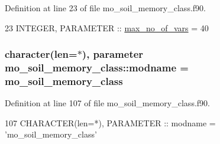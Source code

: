 Definition at line 23 of file mo\+\_\+soil\+\_\+memory\+\_\+class.\+f90.


\begin{DoxyCode}
23   \textcolor{keywordtype}{INTEGER}, \textcolor{keywordtype}{PARAMETER} :: \hyperlink{namespacemo__atmland__memory__class_afae3263e73e4c64ed0955c7ac81cd609}{max\_no\_of\_vars} = 40
\end{DoxyCode}
\hypertarget{namespacemo__soil__memory__class_a3cbf2b7edbe366c9e50eb360d3a1bcbd}{}
\subsubsection[{modname}]{\setlength{\rightskip}{0pt plus 5cm}character(len=$\ast$), parameter mo\+\_\+soil\+\_\+memory\+\_\+class\+::modname = \textquotesingle{}mo\+\_\+soil\+\_\+memory\+\_\+class\textquotesingle{}}\label{namespacemo__soil__memory__class_a3cbf2b7edbe366c9e50eb360d3a1bcbd}


Definition at line 107 of file mo\+\_\+soil\+\_\+memory\+\_\+class.\+f90.


\begin{DoxyCode}
107   \textcolor{keywordtype}{CHARACTER(len=*)}, \textcolor{keywordtype}{PARAMETER} :: modname = \textcolor{stringliteral}{'mo\_soil\_memory\_class'}
\end{DoxyCode}
